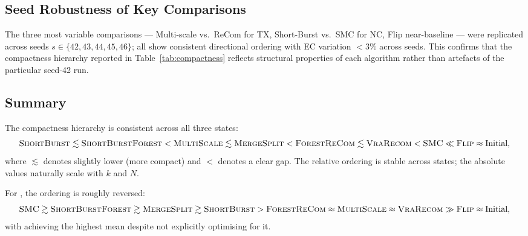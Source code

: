 \subsection{Seed Robustness of Key Comparisons}

The three most variable comparisons --- Multi-scale vs.\ ReCom for TX,
Short-Burst vs.\ SMC for NC, Flip near-baseline --- were replicated across
seeds $s \in \{42, 43, 44, 45, 46\}$; all show consistent directional
ordering with EC variation $< 3\%$ across seeds.
This confirms that the compactness hierarchy reported in
Table~\ref{tab:compactness} reflects structural properties of each algorithm
rather than artefacts of the particular seed-42 run.

\subsection{Summary}

The compactness hierarchy is consistent across all three states:
\[
  \textsc{ShortBurst}{} \lesssim \textsc{ShortBurstForest}{} < \textsc{MultiScale}{} \lesssim \textsc{MergeSplit}{}
  < \textsc{ForestReCom}{} \lesssim \textsc{VraRecom}{} < \textsc{SMC}{} \ll \textsc{Flip}{} \approx \text{Initial},
\]
where $\lesssim$ denotes slightly lower \ec{} (more compact) and $<$
denotes a clear gap.
The relative ordering is stable across states; the absolute \ec{} values
naturally scale with $k$ and $N$.

For \pp{}, the ordering is roughly reversed:
\[
  \textsc{SMC}{} \gtrsim \textsc{ShortBurstForest}{} \gtrsim \textsc{MergeSplit}{} \gtrsim \textsc{ShortBurst}{}
  > \textsc{ForestReCom}{} \approx \textsc{MultiScale}{} \approx \textsc{VraRecom}{} \gg \textsc{Flip}{} \approx \text{Initial},
\]
with \smc{} achieving the highest mean \pp{} despite not explicitly
optimising for it.

